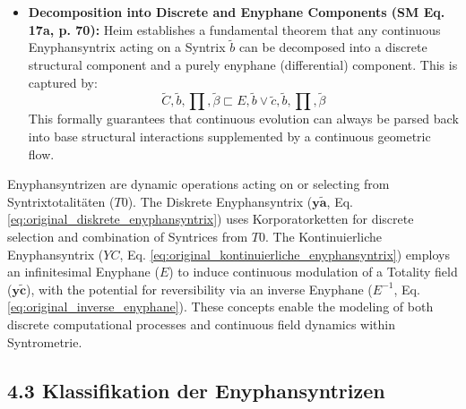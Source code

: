 \documentclass[12pt]{article}
\newcommand{\q}[1]{\enquote{#1}}
\newcommand{\syntrixtotalitaet}{T0}
\newcommand{\diskreteEnyphansyntrix}{\bm{y\widetilde{a}}}
\newcommand{\kontinuierlicheEnyphansyntrix}{YC}
\newcommand{\enyphane}{E}
\begin{document}
\begin{itemize}
\begin{itemize}
        \item The Kontinuierliche Enyphansyntrix \( \kontinuierlicheEnyphansyntrix \) thus represents a process of continuous modulation, evolution, or \q{flow} \textit{of} the Totality field \( \mathbf{y\widetilde{c}} \) itself. This concept is absolutely crucial for linking the abstract logical framework of Syntrometrie to physical field theories or to any system that is described by continuous dynamical laws. It provides a mechanism for describing how the entire potential state space of syntrometric structures can undergo smooth, continuous transformations over time or some other parameter.
    \end{itemize}

    \item \textbf{Decomposition into Discrete and Enyphane Components (SM Eq. 17a, p. 70):}
    Heim establishes a fundamental theorem that any continuous Enyphansyntrix acting on a Syntrix $\widetilde{b}$ can be decomposed into a discrete structural component and a purely enyphane (differential) component. This is captured by:
    \begin{equation}
    \widetilde{C}, \widetilde{b}, \prod, \widetilde{\beta} \sqsubset E, \widetilde{b} \vee \widetilde{c}, \widetilde{b}, \prod, \widetilde{\beta}
    \label{eq:original_decomposition_17a}
    \end{equation}
    This formally guarantees that continuous evolution can always be parsed back into base structural interactions supplemented by a continuous geometric flow.
\end{itemize}

Enyphansyntrizen are dynamic operations acting on or selecting from Syntrixtotalitäten (\(\syntrixtotalitaet\)). The Diskrete Enyphansyntrix (\(\diskreteEnyphansyntrix\), Eq. \eqref{eq:original_diskrete_enyphansyntrix}) uses Korporatorketten for discrete selection and combination of Syntrices from \( \syntrixtotalitaet \). The Kontinuierliche Enyphansyntrix (\(\kontinuierlicheEnyphansyntrix\), Eq. \eqref{eq:original_kontinuierliche_enyphansyntrix}) employs an infinitesimal Enyphane (\(\enyphane\)) to induce continuous modulation of a Totality field (\(\mathbf{y\widetilde{c}}\)), with the potential for reversibility via an inverse Enyphane (\(\enyphane^{-1}\), Eq. \eqref{eq:original_inverse_enyphane}). These concepts enable the modeling of both discrete computational processes and continuous field dynamics within Syntrometrie.

\subsection{4.3 Klassifikation der Enyphansyntrizen}
\label{sec:enyphansyntrix_classification}
\end{document}
